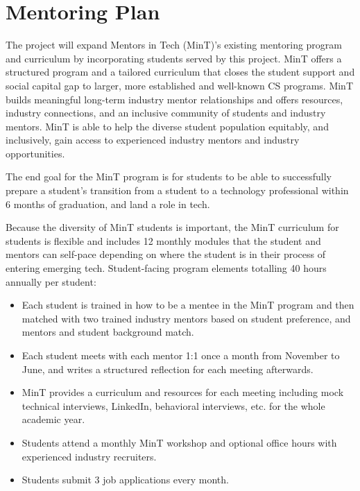 %
%
\section{Mentoring Plan}

The project will expand Mentors in Tech (MinT)'s existing mentoring program and curriculum by incorporating students served by this project. MinT offers a structured program and a tailored curriculum that closes the student support and social capital gap to larger, more established and well-known CS programs. MinT builds meaningful long-term industry mentor relationships and offers resources, industry connections, and an inclusive community of students and industry mentors. MinT is able to help the diverse student population equitably, and inclusively, gain access to experienced industry mentors and industry opportunities.

The end goal for the MinT program is for students to be able to successfully prepare a student’s transition from a student to a technology professional within 6 months of graduation, and land a role in tech.

Because the diversity of MinT students is important, the MinT curriculum for students is flexible and includes 12 monthly modules that the student and mentors can self-pace depending on where the student is in their process of entering emerging tech.  Student-facing program elements totalling 40 hours annually per student:

\begin{itemize}
    \item Each student is trained in how to be a mentee in the MinT program and then matched with two trained industry mentors based on student preference, and mentors and student background match.

    \item Each student meets with each mentor 1:1 once a month from November to June, and writes a structured reflection for each meeting afterwards.

    \item MinT provides a curriculum and resources for each meeting including mock technical interviews, LinkedIn, behavioral interviews, etc. for the whole academic year.

    \item Students attend a monthly MinT workshop and optional office hours with experienced industry recruiters.

    \item Students submit 3 job applications every month.
\end{itemize}

